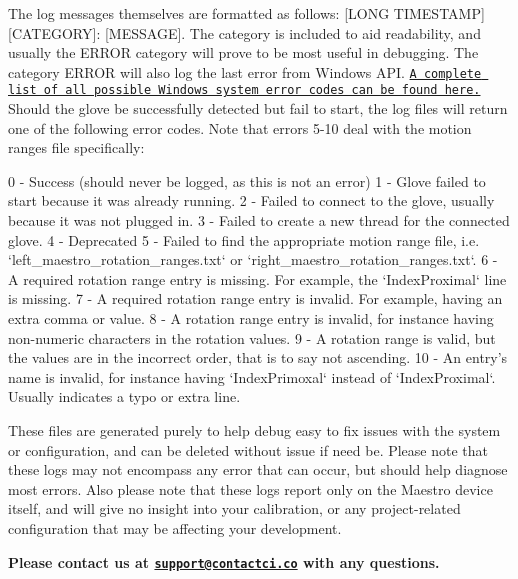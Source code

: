 The log messages themselves are formatted as follows\+: {\ttfamily \mbox{[}L\+O\+NG T\+I\+M\+E\+S\+T\+A\+MP\mbox{]}\mbox{[}C\+A\+T\+E\+G\+O\+RY\mbox{]}\+: \mbox{[}M\+E\+S\+S\+A\+GE\mbox{]}}. The category is included to aid readability, and usually the {\ttfamily E\+R\+R\+OR} category will prove to be most useful in debugging. The category {\ttfamily E\+R\+R\+OR} will also log the last error from Windows A\+PI. \href{https://msdn.microsoft.com/en-us/library/windows/desktop/ms681381(v=vs.85).aspx}{\tt A complete list of all possible Windows system error codes can be found here.} Should the glove be successfully detected but fail to start, the log files will return one of the following error codes. Note that errors 5-\/10 deal with the motion ranges file specifically\+: \begin{DoxyVerb}0 - Success (should never be logged, as this is not an error)
1 - Glove failed to start because it was already running.
2 - Failed to connect to the glove, usually because it was not plugged in.
3 - Failed to create a new thread for the connected glove.
4 - Deprecated
5 - Failed to find the appropriate motion range file, i.e. `left_maestro_rotation_ranges.txt` or `right_maestro_rotation_ranges.txt`.
6 - A required rotation range entry is missing. For example, the `IndexProximal` line is missing.
7 - A required rotation range entry is invalid. For example, having an extra comma or value.
8 - A rotation range entry is invalid, for instance having non-numeric characters in the rotation values.
9 - A rotation range is valid, but the values are in the incorrect order, that is to say not ascending.
10 - An entry's name is invalid, for instance having `IndexPrimoxal` instead of `IndexProximal`. Usually indicates a typo or extra line.
\end{DoxyVerb}


These files are generated purely to help debug easy to fix issues with the system or configuration, and can be deleted without issue if need be. Please note that these logs may not encompass any error that can occur, but should help diagnose most errors. Also please note that these logs report only on the Maestro device itself, and will give no insight into your calibration, or any project-\/related configuration that may be affecting your development.

{\bfseries Please contact us at \href{mailto:support@contactci.co}{\tt support@contactci.\+co} with any questions.} 